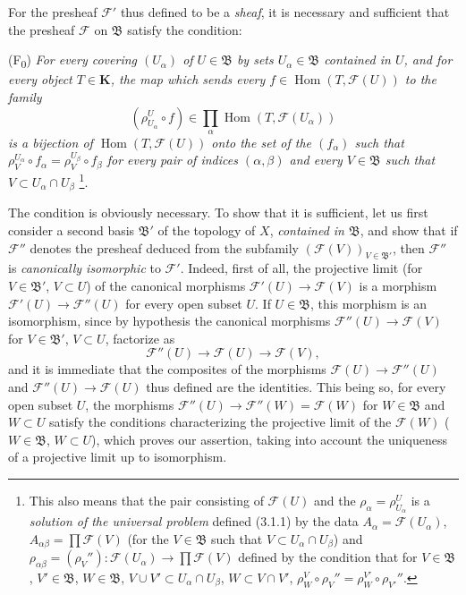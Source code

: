 \begin{env}[3.2.2]
\label{0.3.2.2}
For the presheaf $\mathcal{F}'$ thus defined to be a \emph{sheaf},
it is necessary and sufficient that the presheaf $\mathcal{F}$ on $\mathfrak{B}$
satisfy the condition:

\smallskip
\noindent
\textup{(F\textsubscript{0})} \emph{For every covering $(U_\alpha)$ of
$U\in\mathfrak{B}$ by sets $U_\alpha\in\mathfrak{B}$ contained in
$U$, and for every object $T\in\mathbf{K}$, the map which sends every
$f\in\operatorname{Hom}(T,\mathcal{F}(U))$ to the family
\[
  (\rho_{U_\alpha}^{U}\circ f)
  \in\prod_\alpha\operatorname{Hom}(T,\mathcal{F}(U_\alpha))
\]
is a bijection of $\operatorname{Hom}(T,\mathcal{F}(U))$ onto the set of the
$(f_\alpha)$ such that
$\rho_V^{U_\alpha}\circ f_\alpha=\rho_V^{U_\beta}\circ f_\beta$ for every
pair of indices $(\alpha,\beta)$ and every $V\in\mathfrak{B}$ such that
$V\subset U_\alpha\cap U_\beta$}%
\footnote{This also means that the pair consisting of $\mathcal{F}(U)$ and the
$\rho_\alpha=\rho_{U_\alpha}^{U}$ is a \emph{solution of the universal problem}
defined (3.1.1) by the data
$A_\alpha=\mathcal{F}(U_\alpha)$,
$A_{\alpha\beta}=\prod\mathcal{F}(V)$ (for the $V\in\mathfrak{B}$ such that
$V\subset U_\alpha\cap U_\beta$) and
$\rho_{\alpha\beta}=(\rho_V''):\mathcal{F}(U_\alpha)\to
\prod\mathcal{F}(V)$ defined by the condition that for
$V\in\mathfrak{B}$, $V'\in\mathfrak{B}$, $W\in\mathfrak{B}$,
$V\cup V'\subset U_\alpha\cap U_\beta$, $W\subset V\cap V'$,
$\rho_W^V\circ\rho_V''=\rho_W^{V'}\circ\rho_{V'}''$.}.

The condition is obviously necessary. To show that it is sufficient,
let us first consider a second basis $\mathfrak{B}'$ of the topology of $X$,
\emph{contained in $\mathfrak{B}$}, and show that if $\mathcal{F}''$
denotes the presheaf deduced from the subfamily
$(\mathcal{F}(V))_{V\in\mathfrak{B}'}$, then $\mathcal{F}''$ is
\emph{canonically isomorphic} to $\mathcal{F}'$. Indeed, first of all, the
projective limit (for $V\in\mathfrak{B}'$, $V\subset U$) of the canonical
morphisms $\mathcal{F}'(U)\to\mathcal{F}(V)$ is a morphism
$\mathcal{F}'(U)\to\mathcal{F}''(U)$ for every open subset $U$. If
$U\in\mathfrak{B}$, this morphism is an isomorphism, since by hypothesis the
canonical morphisms $\mathcal{F}''(U)\to\mathcal{F}(V)$ for
$V\in\mathfrak{B}'$, $V\subset U$, factorize as
\[
  \mathcal{F}''(U)\to\mathcal{F}(U)\to\mathcal{F}(V),
\]
and it is immediate that the composites of the morphisms
$\mathcal{F}(U)\to\mathcal{F}''(U)$ and
$\mathcal{F}''(U)\to\mathcal{F}(U)$ thus defined are the identities. This
being so, for every open subset $U$, the morphisms
$\mathcal{F}''(U)\to\mathcal{F}''(W)=\mathcal{F}(W)$ for
$W\in\mathfrak{B}$ and $W\subset U$ satisfy the conditions characterizing the
projective limit of the $\mathcal{F}(W)$ ($W\in\mathfrak{B}$, $W\subset U$), which
proves our assertion, taking into account the uniqueness of a projective limit
up to isomorphism.


\end{env}
